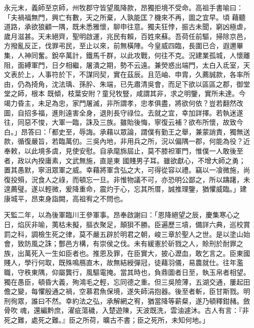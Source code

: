 \begin{pinyinscope}
 永元末，義師至京師，州牧郡守皆望風降款，昂獨拒境不受命。高祖手書喻曰：「夫禍福無門，興亡有數，天之所棄，人孰能匡？機來不再，圖之宜早。頃
 藉聽道路，承欲狼顧一隅，既未悉雅懷，聊申往意。獨夫狂悖，振古未聞，窮凶極虐，歲月滋甚。天未絕齊，聖明啟運，兆民有賴，百姓來蘇。吾荷任前驅，掃除京邑，方撥亂反正，伐罪弔民，至止以來，前無橫陣。今皇威四臨，長圍已合，遐邇畢集，人神同奮。銳卒萬計，鐵馬千群，以此攻戰，何往不克。況建業孤城，人懷離阻，面縛軍門，日夕相繼，屠潰之期，勢不云遠。兼熒惑出端門，太白入氐室，天文表於上，人事符於下，不謀同契，實在茲辰。且范岫、申胄，久薦誠款，各率所由，仍為掎角，沈法瑀、孫肸、朱端，已先肅清吳會，而足下欲以區區之郡，御堂堂之師，根本
 既傾，枝葉安附？童兒牧豎，咸謂其非，求之明鑒，實所未達。今竭力昏主，未足為忠，家門屠滅，非所謂孝，忠孝俱盡，將欲何依？豈若翻然改圖，自招多福，進則遠害全身，退則長守祿位。去就之宜，幸加詳擇。若執迷遂往，同惡不悛，大軍一臨，誅及三族。雖貽後悔，寧復云補？欲布所懷，故致今白。」昂答曰：「都史至，辱誨。承藉以眾論，謂僕有勤王之舉，兼蒙誚責，獨無送款，循復嚴旨，若臨萬仞。三吳內地，非用兵之所，況以偏隅一郡，何能為役？近奉敕，以此境多虞，見使安慰。自承麾旆屆止，莫不膝袒軍門，惟僕一人敢後至者，政以內揆庸素，文武無施，直是東
 國賤男子耳。雖欲獻心，不增大師之勇；置其愚默，寧沮眾軍之威。幸藉將軍含弘之大，可得從容以禮。竊以一飡微施，尚復投殞，況食人之祿，而頓忘一旦。非惟物議不可，亦恐明公鄙之，所以躊躇，未遑薦璧。遂以輕微，爰降重命，震灼于心，忘其所厝，誠推理鑒，猶懼威臨。」建康城平，昂束身詣闕，高祖宥之不問也。



 天監二年，以為後軍臨川王參軍事。昂奉啟謝曰：「恩降絕望之辰，慶集寒心之日，焰灰非喻，荑枯未擬，摳衣聚足，顛狽不勝。臣遍歷三墳，備詳六典，巡校賞罰之科，調檢生死之律，莫不嚴五辟於明君之朝，峻三章於聖人之世。是以塗山始
 會，致防風之誅；酆邑方構，有崇侯之伐。未有緩憲於斫戮之人，賒刑於耐罪之族，出萬死入一生如臣者也。推恩及罪，在臣實大，披心瀝血，敢乞言之。臣東國賤人，學行何取，既殊鳴鴈直木，故無結綬彈冠，徒藉羽儀，易農就仕。往年濫職，守秩東隅，仰屬龔行，風驅電掩。當其時也，負鼎圖者日至，執玉帛者相望。獨在愚臣，頓昏大義，殉鴻毛之輕，忘同德之重。但三吳險薄，五湖交通，屢起田儋之變，每懼殷通之禍，空慕君魚保境，遂失師涓抱器。後至者斬，臣甘斯戮。明刑徇眾，誰曰不然。幸約法之弘，承解網之宥，猶當降等薪粲，遂乃頓釋鉗赭。斂骨吹
 魂，還編黔庶，濯疵蕩穢，入楚遊陳，天波既洗，雲油遽沐。古人有言：『非死之難，處死之難。』臣之所荷，曠古不書；臣之死所，未知何地。」




\end{pinyinscope}
